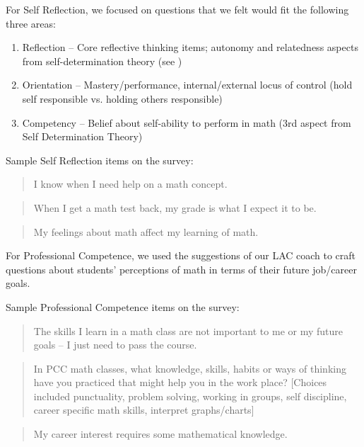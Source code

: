 \begin{description}
For Self Reflection, we focused on questions that we felt would fit the following three areas:
\begin{enumerate}
\item Reflection -- Core reflective thinking items; autonomy and relatedness aspects from self-determination theory (see \cite{selfdetermination})
\item Orientation -- Mastery/performance, internal/external locus of control (hold self responsible vs. holding others responsible)
\item Competency -- Belief about self-ability to perform in math (3rd aspect from Self Determination Theory) 
\end{enumerate}
Sample Self Reflection items on the survey:
\begin{quote}
\item I know when I need help on a math concept.
\end{quote}
\begin{quote}
\item When I get a math test back, my grade is what I expect it to be.
\end{quote}
\begin{quote}
\item My feelings about math affect my learning of math.
\end{quote}

For Professional Competence, we used the suggestions of our LAC coach to craft questions about students' perceptions of math in terms of their future job/career goals. 

Sample Professional Competence items on the survey:
\begin{quote}
The skills I learn in a math class are not important to me or my future goals -- I just need to pass the course.
\end{quote}
\begin{quote}
In PCC math classes, what knowledge, skills, habits or ways of thinking have you practiced that might help you in the work place? [Choices included punctuality, problem solving, working in groups, self discipline, career specific math skills, interpret graphs/charts]
\end{quote}
\begin{quote}
My career interest requires some mathematical knowledge.
\end{quote}

\item[2012/13:  Critical Thinking \& Problem-Solving and Professional Competence]


\end{description}
